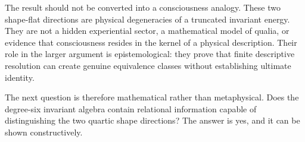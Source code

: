 The result should not be converted into a consciousness analogy. These two shape-flat directions are physical degeneracies of a truncated invariant energy. They are not a hidden experiential sector, a mathematical model of qualia, or evidence that consciousness resides in the kernel of a physical description. Their role in the larger argument is epistemological: they prove that finite descriptive resolution can create genuine equivalence classes without establishing ultimate identity.

The next question is therefore mathematical rather than metaphysical. Does the degree-six invariant algebra contain relational information capable of distinguishing the two quartic shape directions? The answer is yes, and it can be shown constructively.
